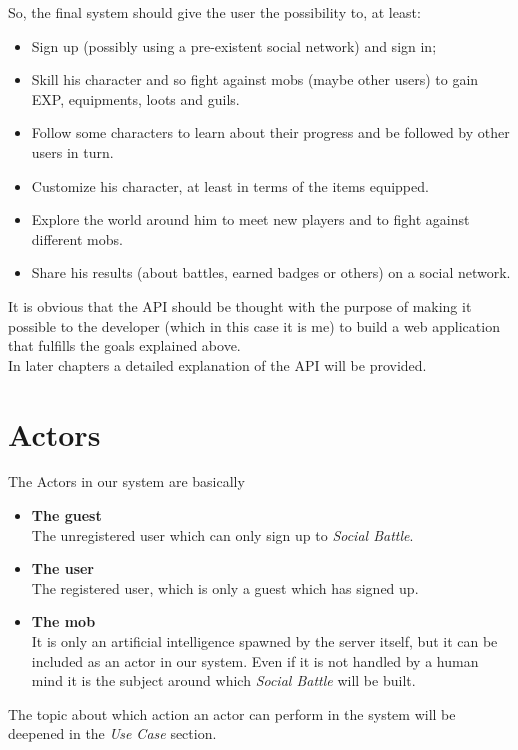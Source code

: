 	\noindent So, the final system should give the user the possibility to, at least:
	\newcommand{\goalSignup}{Sign up (possibly using a pre-existent social network) and sign in;}
	\newcommand{\goalSkill}{Skill his character and so fight against mobs (maybe other users) to gain
			EXP, equipments, loots and guils.}
	\newcommand{\goalFollow}{Follow some characters to learn about their progress and be followed by other users in turn.}
	\newcommand{\goalProfile}{Customize his character, at least in terms of the items equipped.}
	\newcommand{\goalExplore}{Explore the world around him to meet new players and to fight against different mobs.}
	\newcommand{\goalShare}{Share his results (about battles, earned badges or others) on a social network.}
	\begin{itemize}
		\item \goalSignup
		\item \goalSkill
		\item \goalFollow
		\item \goalProfile
		\item \goalExplore
		\item \goalShare
	\end{itemize}

	\noindent It is obvious that the API should be thought with the purpose of making it possible to the developer 
	(which in this case it is me) to build a web application that fulfills the goals explained above.\\
	In later chapters a detailed explanation of the API will be provided.

	\section{Actors}
	The Actors in our system are basically
	\begin{itemize}
		\item \textbf{The guest}\\
		The unregistered user which can only sign up to \textit{Social Battle}.
		\item \textbf{The user}\\
		The registered user, which is only a guest which has signed up.
		\item \textbf{The mob}\\
		It is only an artificial intelligence spawned by the server itself, but it can be included as an actor in 
		our system. Even if it is not handled by a human mind it is the subject around which \textit{Social Battle} 
		will be built.
	\end{itemize}
	The topic about which action an actor can perform in the system will be deepened in the \textit{Use Case} section.